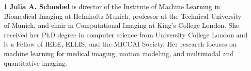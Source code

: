 \documentclass[12pt]{spieman}  %
\begin{document}
\begin{spacing}{1}
\noindent\textbf{Julia A. Schnabel} is director of the Institute of Machine Learning in Biomedical Imaging at Helmholtz Munich, professor at the Technical University of Munich, and chair in Computational Imaging at King's College London.
She received her PhD degree in computer science from University College London and is a Fellow of IEEE, ELLIS, and the MICCAI Society.
Her research focuses on machine learning for medical imaging, motion modeling, and multimodal and quantitative imaging.


\end{spacing}
\end{document}
